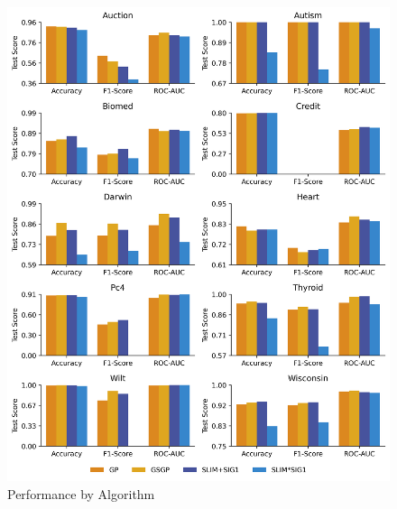 
    \begin{figure}[h]
    \centering
    \includegraphics[width=\linewidth]{../Latex/Chapters/Figures/Results/comparison_performance.png}
    \caption{Performance by Algorithm}
    \label{fig:performance}
    \end{figure}
    